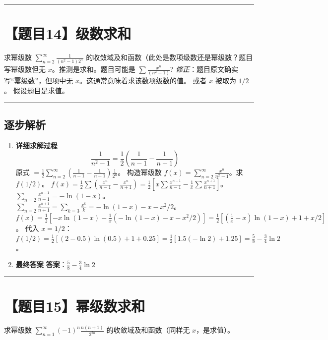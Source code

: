 \documentclass[UTF8]{ctexart}
\newenvironment{redenv}{\color{red}}{}
\newenvironment{detailedanalysis}{%
    \color{red}
    \begin{enumerate}[label=\textbf{第\arabic*步：}, leftmargin=*, align=left, itemsep=1.5ex]
}{%
    \end{enumerate}
}
\newcommand{\problemrule}{\noindent\rule{\textwidth}{1.5pt}\vspace{-0.8em}}
\newcommand{\analysisrule}{\noindent\rule{\textwidth}{0.8pt}\vspace{-0.8em}}
\begin{document}
\problemrule
\section*{【题目14】级数求和}
求幂级数 $ \sum_{n=2}^{\infty}\frac{1}{(n^{2}-1)2^{n}} $ 的收敛域及和函数（此处是数项级数还是幂级数？题目写幂级数但无 $x$。推测是求和。题目可能是 $ \sum \frac{x^n}{(n^2-1)} $?
\emph{修正}：题目原文确实写“幂级数”，但项中无 $x$。这通常意味着求该数项级数的值。
或者 $x$ 被取为 $1/2$。
假设题目是求值。

\begin{redenv}
\analysisrule
\subsection*{逐步解析}

\begin{detailedanalysis}
\item \textbf{详细求解过程}
$$ \frac{1}{n^2-1} = \frac{1}{2}(\frac{1}{n-1} - \frac{1}{n+1}) $$
原式 $= \frac{1}{2} \sum_{n=2}^\infty (\frac{1}{n-1} - \frac{1}{n+1}) \frac{1}{2^n}$。
构造幂级数 $f(x) = \sum_{n=2}^\infty \frac{x^n}{n^2-1}$。求 $f(1/2)$。
$f(x) = \frac{1}{2} \sum (\frac{x^n}{n-1} - \frac{x^n}{n+1}) = \frac{1}{2} [x \sum \frac{x^{n-1}}{n-1} - \frac{1}{x} \sum \frac{x^{n+1}}{n+1}]$。
$\sum_{n=2} \frac{x^{n-1}}{n-1} = -\ln(1-x)$。
$\sum_{n=2} \frac{x^{n+1}}{n+1} = \sum_{k=3} \frac{x^k}{k} = -\ln(1-x) - x - x^2/2$。
$f(x) = \frac{1}{2} [-x\ln(1-x) - \frac{1}{x}(-\ln(1-x) - x - x^2/2)] = \frac{1}{2} [(\frac{1}{x}-x)\ln(1-x) + 1 + x/2]$。
代入 $x=1/2$：
$f(1/2) = \frac{1}{2} [(2 - 0.5)\ln(0.5) + 1 + 0.25] = \frac{1}{2} [1.5(-\ln 2) + 1.25] = \frac{5}{8} - \frac{3}{4}\ln 2$。

\item \textbf{最终答案}
\textbf{答案}：$ \frac{5}{8} - \frac{3}{4}\ln 2 $
\end{detailedanalysis}
\end{redenv}

\problemrule
\section*{【题目15】幂级数求和}
求幂级数 $ \sum_{n=1}^{\infty} (-1)^{n} \frac{n(n+1)}{2^{2n}} $ 的收敛域及和函数（同样无 $x$，是求值）。
\end{document}
